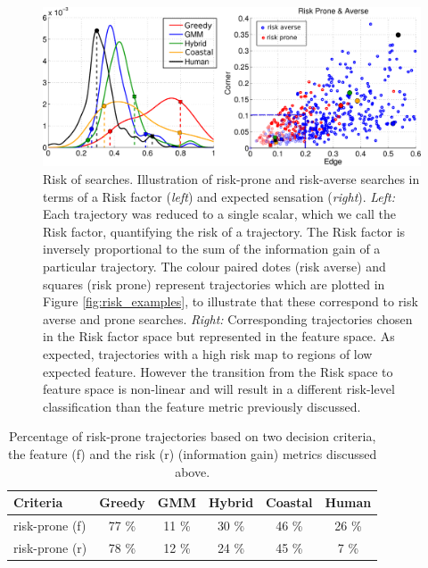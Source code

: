 \begin{figure}
  \centering
  \includegraphics[width=\textwidth]{./ch3-Search/Figures/Figure7} 
 \caption{Risk of searches. Illustration of risk-prone and risk-averse searches in terms of a Risk factor (\textit{left}) and expected sensation (\textit{right}).
 \textit{Left:} Each trajectory was reduced to a single scalar, which we call the Risk factor, quantifying the risk of a trajectory. The Risk factor 
 is inversely proportional to the sum of the information gain of a particular trajectory. The colour paired dotes (risk averse) and squares (risk prone) 
 represent trajectories which are plotted in 
 Figure \ref{fig:risk_examples}, to illustrate that these correspond to risk averse and prone searches.
 \textit{Right:} Corresponding trajectories chosen in the Risk factor space but represented in the feature space. As expected, trajectories with
 a high risk map to regions of low expected feature. However the transition from the Risk space to feature space is non-linear and will result in a different
 risk-level classification than the feature metric previously discussed.}
 \label{fig:riskexamples}
\end{figure}



\begin{table}
\centering
\begin{minipage}{\textwidth}
\centering
 \begin{tabular}{|l|c|c|c|c|c|}
 \cline{1-6}
   Criteria        &  \textbf{Greedy} & \textbf{GMM}  & \textbf{Hybrid} & \textbf{Coastal} & \textbf{Human} \\ \hline
  risk-prone (f) &   77 \% & 11 \% &  30 \% & 46 \% & 26  \% \\ \hline
  risk-prone (r) &   78 \% & 12 \% &  24 \% & 45 \% &  7 \% \\ \hline
 \end{tabular}
\end{minipage}
 \caption{Percentage of risk-prone trajectories based on two decision criteria, the feature (f) and the risk (r) (information gain) metrics discussed above.}
 \label{tab:percentage-risk-prone}
\end{table}

